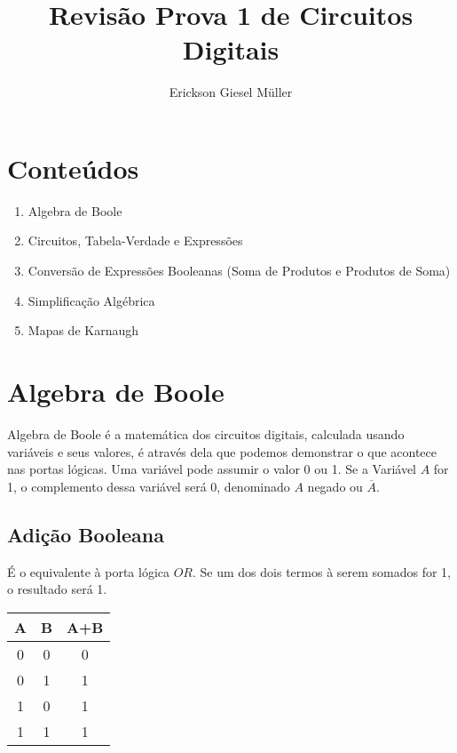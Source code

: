 \documentclass{article}
\title{Revisão Prova 1 de Circuitos Digitais}
\author{Erickson Giesel Müller}
\begin{document}
	\maketitle
	\section{Conteúdos}
		\begin{enumerate}
			\item Algebra de Boole
			\item Circuitos, Tabela-Verdade e Expressões
			\item Conversão de Expressões Booleanas (Soma de Produtos e Produtos de Soma)
			\item Simplificação Algébrica
			\item Mapas de Karnaugh
		\end{enumerate}
		
	\section{Algebra de Boole}
	
		Algebra de Boole é a matemática dos circuitos digitais, calculada usando variáveis e seus valores, é através dela que podemos demonstrar o que acontece nas portas lógicas. Uma variável pode assumir o valor 0 ou 1. Se a Variável $A$ for 1, o complemento dessa variável será 0, denominado $A$ negado ou $\overline{A}$.
		\subsection{Adição Booleana}
			É o equivalente à porta lógica $OR$. Se um dos dois termos à serem somados for 1, o resultado será 1.\\
				\hspace*{4 cm}
				\begin{tabular}{|c|c|c|}
					\hline
					A & B & A+B \\
					\hline
					0 & 0 & 0 \\
					\hline
					0 & 1 & 1 \\
					\hline
					1 & 0 & 1 \\
					\hline
					1 & 1 & 1 \\
					\hline
				\end{tabular}
				
\end{document}

